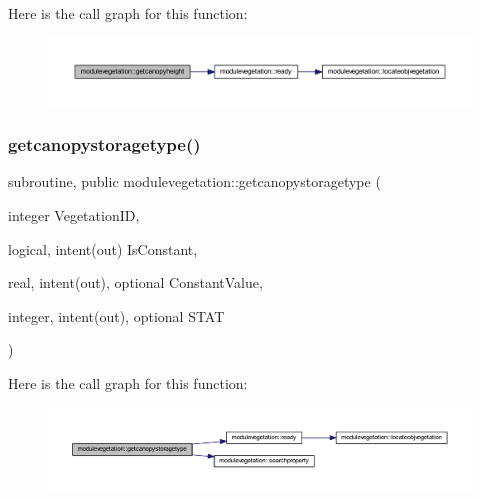 Here is the call graph for this function\+:\nopagebreak
\begin{figure}[H]
\begin{center}
\leavevmode
\includegraphics[width=350pt]{namespacemodulevegetation_af38b12fb3f6aba5eaf0e0153c1a5cf5b_cgraph}
\end{center}
\end{figure}
\mbox{\label{namespacemodulevegetation_a518c8834ccdc068342976e2fb709d93e}} 
\subsubsection{\texorpdfstring{getcanopystoragetype()}{getcanopystoragetype()}}
{\footnotesize\ttfamily subroutine, public modulevegetation\+::getcanopystoragetype (\begin{DoxyParamCaption}\item[{integer}]{Vegetation\+ID,  }\item[{logical, intent(out)}]{Is\+Constant,  }\item[{real, intent(out), optional}]{Constant\+Value,  }\item[{integer, intent(out), optional}]{S\+T\+AT }\end{DoxyParamCaption})}

Here is the call graph for this function\+:\nopagebreak
\begin{figure}[H]
\begin{center}
\leavevmode
\includegraphics[width=350pt]{namespacemodulevegetation_a518c8834ccdc068342976e2fb709d93e_cgraph}
\end{center}
\end{figure}
\mbox{\label{namespacemodulevegetation_ac3fe071c0a204afbed0b3414ecb4e09d}} 
